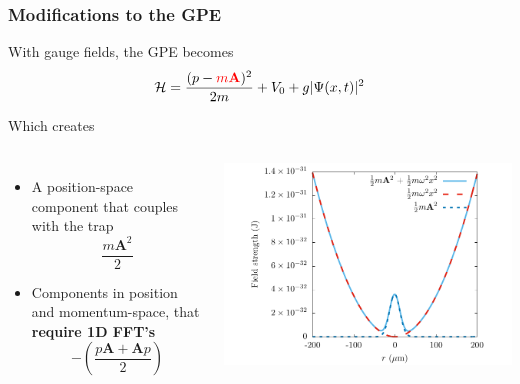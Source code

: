 \documentclass{beamer}
\begin{document}
\begin{frame}
\frametitle{Modifications to the GPE}
With gauge fields, the GPE becomes
\begin{equation*}
\mathcal{ H} = \frac{(p-{\color{red}{m\mathbf{A}}} )^2}{2m} + V_0 + g|\Psi(x,t)|^2
\end{equation*}

Which creates

\begin{columns}
\begin{itemize}
\item A position-space component that couples with the trap
$$
\frac{m\mathbf{A}^2}{2}
$$

\item Components in position and momentum-space, that \textbf{require 1D FFT's}
$$
-\left(\frac{p\mathbf{A} + \mathbf{A}p}{2}\right)
$$
\end{itemize}
\includegraphics[width=1.1\textwidth]{../data/splitop/gauge/check.pdf}
\end{columns}

\end{frame}
\end{document}

